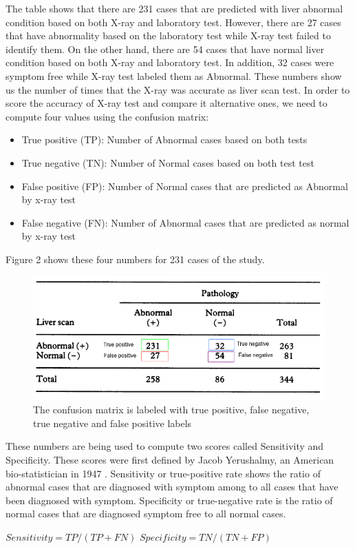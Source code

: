 \documentclass[12pt]{article}
\begin{document}
The table shows that there are 231 cases that are predicted with liver abnormal condition based on both X-ray and laboratory test. However, there are 27 cases that have abnormality based on the laboratory test while X-ray test failed to identify them. On the other hand, there are 54 cases that have normal liver condition based on both X-ray and laboratory test. In addition, 32 cases were symptom free while X-ray test labeled them as Abnormal. 
These numbers show us the number of times that the X-ray was accurate as liver scan test. In order to score the accuracy of X-ray test and compare it alternative ones, we need to compute four values using the confusion matrix: 
\begin{center}
\begin{itemize}
\item True positive (TP): Number of Abnormal cases based on both tests 
\item True negative (TN): Number of Normal cases based on both test test
\item False positive (FP): Number of Normal cases that are predicted as Abnormal by x-ray test 
\item False negative (FN): Number of Abnormal cases that are predicted as normal by x-ray test
\end{itemize}
\end{center}
Figure 2 shows these four numbers for 231 cases of the study. 

\begin{figure}
\includegraphics[width=\textwidth]{labeledCFT.png}
\caption{The confusion matrix is labeled with true positive, false negative, true negative and false positive labels} \label{fig1}
\end{figure}


These numbers are being used to compute two scores called Sensitivity and Specificity. These scores were first defined by Jacob Yerushalmy, an American bio-statistician in 1947 \cite{biostat}. Sensitivity or true-positive rate shows the ratio of abnormal cases that are diagnosed with symptom among to all cases that have been diagnosed with symptom. Specificity or true-negative rate is the ratio of normal cases that are diagnosed symptom free to all normal cases.\\
\begin{center}
$Sensitivity = TP / (TP+FN)$ \space $Specificity = TN / (TN + FP)$
\end{center}
\end{document}
